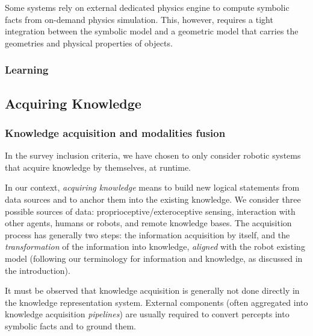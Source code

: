 Some systems \cite{Kunze2011a} rely on external dedicated physics engine to
compute symbolic facts from on-demand physics simulation. This, however,
requires a tight integration between the symbolic model and a geometric model
that carries the geometries and physical properties of objects.

\subsubsection{Learning}
\label{sect|learning}

\subsection{Acquiring Knowledge}

\begin{scriptsize}
\begin{center}
\end{center}
\end{scriptsize}

\subsubsection{Knowledge acquisition and modalities fusion}
\label{sect|knowledge-acquisition}

In the survey inclusion criteria, we have chosen to only consider robotic
systems that acquire knowledge by themselves, at runtime.

In our context, \emph{acquiring knowledge} means to build new logical
statements from data sources and to anchor them into the existing knowledge. We
consider three possible sources of data: proprioceptive/exteroceptive sensing,
interaction with other agents, humans or robots, and remote knowledge bases.
The acquisition process has generally two steps: the information acquisition by
itself, and the \emph{transformation} of the information into knowledge,
\emph{aligned} with the robot existing model (following our terminology for
information and knowledge, as discussed in the introduction).

It must be observed that knowledge acquisition is generally not done directly
in the knowledge representation system. External components (often aggregated
into knowledge acquisition \emph{pipelines}) are usually required to convert
percepts into symbolic facts and to ground them.

